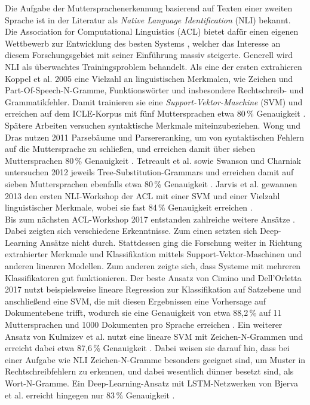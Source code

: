 \documentclass[bachelor,german]{info1thesis}
\begin{document}
Die Aufgabe der Muttersprachenerkennung basierend auf Texten einer zweiten Sprache ist in der Literatur als \textit{Native Language Identification} (NLI) bekannt. Die Association for Computational Linguistics (ACL) bietet dafür einen eigenen Wettbewerb zur Entwicklung des besten Systems \cite{Tetreault2013,Malmasi2017}, welcher das Interesse an diesem Forschungsgebiet mit seiner Einführung massiv steigerte. Generell wird NLI als überwachtes Trainingsproblem behandelt. Als eine der ersten extrahieren Koppel et al. 2005 eine Vielzahl an linguistischen Merkmalen, wie Zeichen und Part-Of-Speech-N-Gramme, Funktionswörter und insbesondere Rechtschreib- und Grammatikfehler. Damit trainieren sie eine \textit{Support-Vektor-Maschine} (SVM) und erreichen auf dem ICLE-Korpus mit fünf Muttersprachen etwa 80\,\% Genauigkeit \cite{Koppel2005}. \\
Spätere Arbeiten versuchen syntaktische Merkmale miteinzubeziehen. Wong und Dras nutzen 2011 Parsebäume und Parsereranking, um von syntaktischen Fehlern auf die Muttersprache zu schließen, und erreichen damit über sieben Muttersprachen 80\,\% Genauigkeit \cite{Wong2011}. Tetreault et al. sowie Swanson und Charniak untersuchen 2012 jeweils Tree-Substitution-Grammars und erreichen damit auf sieben Muttersprachen ebenfalls etwa 80\,\% Genauigkeit \cite{Tetreault2012,Swanson2012}. Jarvis et al. gewannen 2013 den ersten NLI-Workshop der ACL mit einer SVM und einer Vielzahl linguistischer Merkmale, wobei sie fast 84\,\% Genauigkeit erreichen \cite{Jarvis2013}. \\
Bis zum nächsten ACL-Workshop 2017 entstanden zahlreiche weitere Ansätze \cite{Malmasi2017}. Dabei zeigten sich verschiedene Erkenntnisse. Zum einen setzten sich Deep-Learning Ansätze nicht durch. Stattdessen ging die Forschung weiter in Richtung extrahierter Merkmale und Klassifikation mittels Support-Vektor-Maschinen und anderen linearen Modellen. Zum anderen zeigte sich, dass Systeme mit mehreren Klassifikatoren gut funktionieren. Der beste Ansatz von Cimino und Dell'Orletta 2017 nutzt beispielsweise lineare Regression zur Klassifikation auf Satzebene und anschließend eine SVM, die mit diesen Ergebnissen eine Vorhersage auf Dokumentebene trifft, wodurch sie eine Genauigkeit von etwa 88,2\,\% auf 11 Muttersprachen und 1000 Dokumenten pro Sprache erreichen \cite{Cimino2017}. Ein weiterer Ansatz von Kulmizev et al. nutzt eine lineare SVM mit Zeichen-N-Grammen und erreicht dabei etwa 87,6\,\% Genauigkeit \cite{Kulmizev2017}. Dabei weisen sie darauf hin, dass bei einer Aufgabe wie NLI Zeichen-N-Gramme besonders geeignet sind, um Muster in Rechtschreibfehlern zu erkennen, und dabei wesentlich dünner besetzt sind, als Wort-N-Gramme. Ein Deep-Learning-Ansatz mit LSTM-Netzwerken von Bjerva et al. erreicht hingegen nur 83\,\% Genauigkeit \cite{Bjerva2017}.
\end{document}
